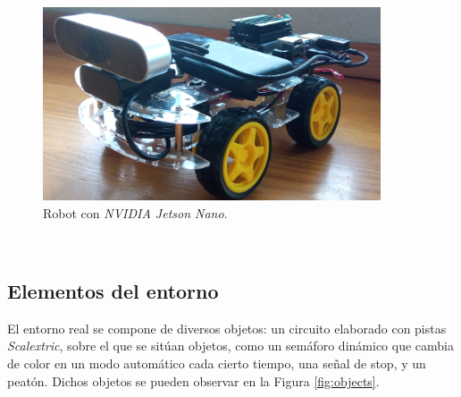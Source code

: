 \begin{figure} [h!]
	\begin{center}
		\includegraphics[width=10cm]{figs/robot}
	\end{center}
	\caption{Robot con \textit{NVIDIA Jetson Nano}.}
	\label{fig:realrobot}
\end{figure}\

\subsection{Elementos del entorno}
El entorno real se compone de diversos objetos: un circuito elaborado con pistas \textit{Scalextric}, sobre el que se sitúan objetos, como un semáforo dinámico que cambia de color en un modo automático cada cierto tiempo, una señal de stop, y un peatón. Dichos objetos se pueden observar en la Figura \ref{fig:objects}.\\

